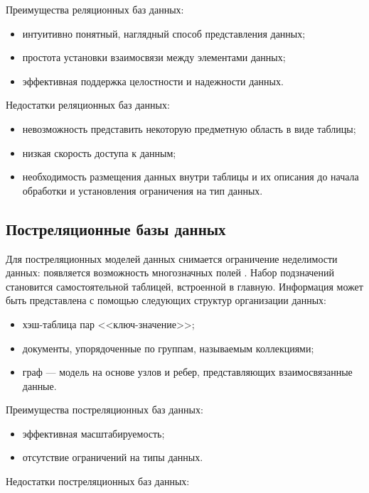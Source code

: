 Преимущества реляционных баз данных:

\begin{itemize}
	\item интуитивно понятный, наглядный способ представления данных;
	\item простота установки взаимосвязи между элементами данных;
	\item эффективная поддержка целостности и надежности данных.
\end{itemize}

Недостатки реляционных баз данных:

\begin{itemize}
	\item невозможность представить некоторую предметную область в виде таблицы;
	\item низкая скорость доступа к данным;
	\item необходимость размещения данных внутри таблицы и их описания до начала обработки и установления ограничения на тип данных.
\end{itemize}

\subsection{Постреляционные базы данных}

Для постреляционных моделей данных снимается ограничение неделимости данных: появляется возможность многозначных полей \cite{after}. Набор подзначений становится самостоятельной таблицей, встроенной в главную. Информация может быть представлена с помощью следующих структур организации данных:

\begin{itemize}
	\item хэш-таблица пар <<ключ-значение>>;
	\item документы, упорядоченные по группам, называемым коллекциями;
	\item граф --- модель на основе узлов и ребер, представляющих взаимосвязанные данные.
\end{itemize}

Преимущества постреляционных баз данных:

\begin{itemize}
	\item эффективная масштабируемость;
	\item отсутствие ограничений на типы данных.
\end{itemize}

Недостатки постреляционных баз данных:

